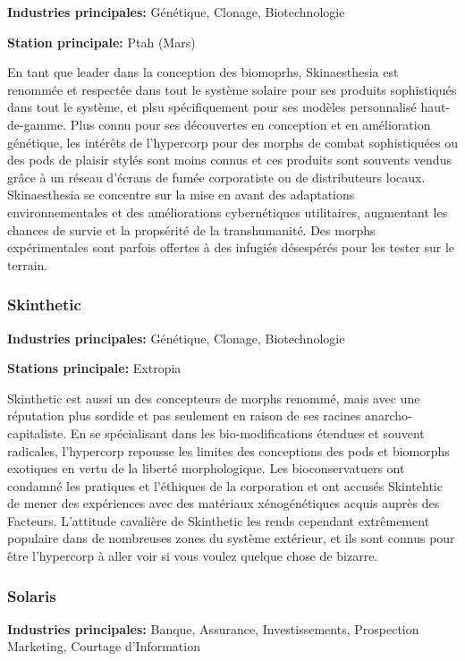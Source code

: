 \textbf{Industries principales:} Génétique, Clonage, Biotechnologie 

\textbf{Station principale:} Ptah (Mars) 

En tant que leader dans la conception des biomoprhs, Skinaesthesia est renommée et respectée dans tout le système solaire pour ses produits sophistiqués dans tout le système, et plsu spécifiquement pour ses modèles personnalisé haut-de-gamme. Plus connu pour ses découvertes en conception et en amélioration génétique, les intérêts de l'hypercorp pour des morphs de combat sophistiquées ou des pods de plaisir stylés sont moins connus et ces produits sont souvents vendus grâce à un réseau d'écrans de fumée corporatiste ou de distributeurs locaux. Skinaesthesia se concentre sur la mise en avant des adaptations environnementales et des améliorations cybernétiques utilitaires, augmentant les chances de survie et la propsérité de la transhumanité. Des morphs expérimentales sont parfois offertes à des infugiés désespérés pour les tester sur le terrain. 

\subsubsection{Skinthetic} \label{sec:skinthetic} 

\textbf{Industries principales:} Génétique, Clonage, Biotechnologie 

\textbf{Stations principale:} Extropia 

Skinthetic est aussi un des concepteurs de morphs renommé, mais avec une réputation plus sordide et pas seulement en raison de ses racines anarcho-capitaliste. En se spécialisant dans les bio-modifications étendues et souvent radicales, l'hypercorp repousse les limites des conceptions des pods et biomorphs exotiques en vertu de la liberté morphologique. Les bioconservatuers ont condamné les pratiques et l'éthiques de la corporation et ont accusés Skintehtic de mener des expériences avec des matériaux xénogénétiques acquis auprès des Facteurs. L'attitude cavalière de Skinthetic les rends cependant extrêmement populaire dans de nombreuses zones du système extérieur, et ils sont connus pour être l'hypercorp à aller voir si vous voulez quelque chose de bizarre. 

\subsubsection{Solaris} \label{sec:solaris} 

\textbf{Industries principales:} Banque, Assurance, Investissements, Prospection Marketing, Courtage d'Information 

